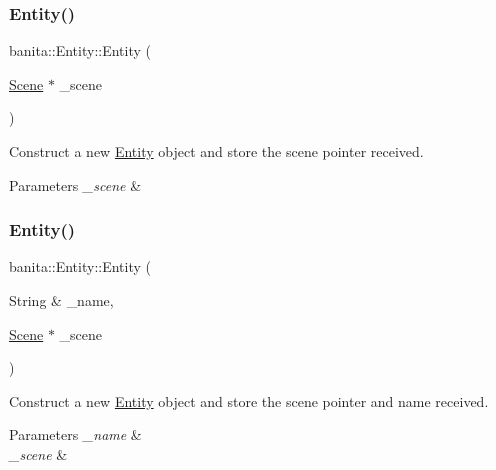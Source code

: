 \subsubsection{\texorpdfstring{Entity()}{Entity()}\hspace{0.1cm}{\footnotesize\ttfamily [1/2]}}
{\footnotesize\ttfamily banita\+::\+Entity\+::\+Entity (\begin{DoxyParamCaption}\item[{\mbox{\hyperlink{classbanita_1_1_scene}{Scene}} $\ast$}]{\+\_\+scene }\end{DoxyParamCaption})}



Construct a new \mbox{\hyperlink{classbanita_1_1_entity}{Entity}} object and store the scene pointer received. 


\begin{DoxyParams}{Parameters}
{\em \+\_\+scene} & \\
\hline
\end{DoxyParams}
\mbox{\label{classbanita_1_1_entity_a01b2f03d793f06528e1d4c4112d4f62d}} 
\subsubsection{\texorpdfstring{Entity()}{Entity()}\hspace{0.1cm}{\footnotesize\ttfamily [2/2]}}
{\footnotesize\ttfamily banita\+::\+Entity\+::\+Entity (\begin{DoxyParamCaption}\item[{String \&}]{\+\_\+name,  }\item[{\mbox{\hyperlink{classbanita_1_1_scene}{Scene}} $\ast$}]{\+\_\+scene }\end{DoxyParamCaption})}



Construct a new \mbox{\hyperlink{classbanita_1_1_entity}{Entity}} object and store the scene pointer and name received. 


\begin{DoxyParams}{Parameters}
{\em \+\_\+name} & \\
\hline
{\em \+\_\+scene} & \\
\hline
\end{DoxyParams}
\mbox{\label{classbanita_1_1_entity_ab426b4d2def681300d007e27626f70da}} 
